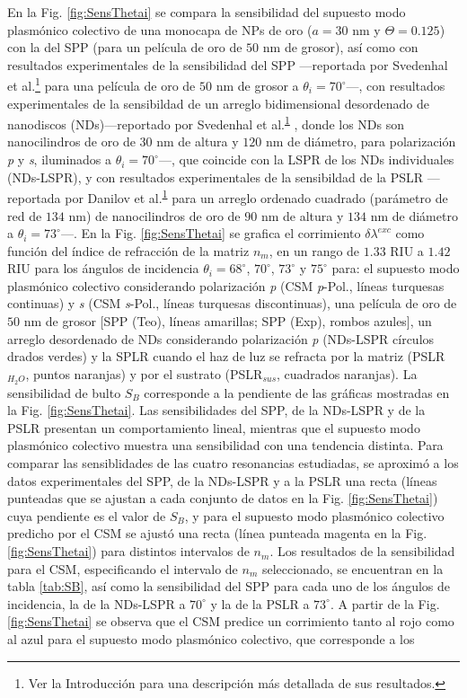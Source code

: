 En la Fig. \ref{fig:SensThetai} se compara la sensibilidad del supuesto modo  plasmónico colectivo de una monocapa de NPs de oro ($a=30$ nm y $\Theta=0.125$) con la del SPP (para un película de oro de $50$ nm de grosor), así como con resultados experimentales de la sensibilidad del SPP ---reportada por  Svedenhal et al.\footnote{\label{fn:Motivacion}Ver la Introducción para una descripción más detallada de sus resultados.} \cite{svedendahl2009refractometric} para una película de oro de $50$ nm de grosor a $\theta_i = 70^\circ$---, con resultados experimentales de la sensibildad de un  arreglo bidimensional desordenado de nanodiscos (NDs)---reportado por Svedenhal et al.\textsuperscript{\ref{fn:Motivacion}}  \cite{svedendahl2009refractometric}, donde los NDs son nanocilindros de oro de $30$ nm de altura y $120$ nm de diámetro, para polarización \emph{p} y \emph{s}, iluminados a $\theta_i = 70^\circ$---, que coincide con la LSPR de los NDs individuales (NDs-LSPR), y con resultados experimentales de la sensibildad de la PSLR ---reportada por Danilov et al.\textsuperscript{\ref{fn:Motivacion}} \cite{danilov2018ultra} para un arreglo ordenado cuadrado (parámetro de red de $134$ nm) de nanocilindros de oro de $90$ nm de altura y $134$ nm de diámetro a $\theta_i= 73^\circ$---. En la Fig. \ref{fig:SensThetai} se grafica el corrimiento $\delta\lambda^{exc}$ como función del índice de refracción de la matriz $n_m$, en un rango de $1.33$ RIU a $1.42$ RIU para los ángulos de incidencia $\theta_i = 68^\circ$, $70^\circ$, $73^\circ$ y $75^\circ$ para: el supuesto modo  plasmónico colectivo considerando polarización \emph{p} (CSM \textit{p}-Pol., líneas turquesas continuas) y \emph{s} (CSM \textit{s}-Pol., líneas turquesas discontinuas), una película de oro de $50$ nm de grosor [SPP (Teo), líneas amarillas; SPP (Exp), rombos azules], un arreglo desordenado de NDs  considerando polarización \emph{p} (NDs-LSPR círculos drados verdes) y la SPLR cuando el haz de luz se refracta por la matriz (PSLR$_{H_{2}O}$, puntos naranjas) y por el sustrato (PSLR$_{sus}$, cuadrados naranjas). La sensibilidad de bulto $S_B$ corresponde a la pendiente de las gráficas mostradas en la Fig. \ref{fig:SensThetai}. Las sensibilidades del SPP, de la NDs-LSPR y de la PSLR presentan un comportamiento lineal, mientras que el supuesto modo  plasmónico colectivo muestra una sensibilidad con una tendencia distinta. Para comparar las sensiblidades de las cuatro resonancias estudiadas, se aproximó a los datos experimentales del SPP, de la NDs-LSPR y a la PSLR una recta (líneas punteadas que se ajustan a cada conjunto de datos en la Fig. \ref{fig:SensThetai}) cuya pendiente es el valor de $S_B$, y para el supuesto modo  plasmónico colectivo predicho por el CSM se ajustó una recta (línea punteada magenta en la Fig. \ref{fig:SensThetai}) para distintos intervalos de $n_m$. Los resultados de la sensibilidad para el CSM, especificando el  intervalo de $n_m$ seleccionado, se  encuentran en la tabla \ref{tab:SB}, así como la sensibilidad del SPP para cada uno de los ángulos de incidencia, la de la NDs-LSPR a $70^\circ$ y la de la PSLR a $73^\circ$. A partir de la Fig. \ref{fig:SensThetai} se observa que el  CSM predice un corrimiento tanto al  rojo como al azul para el supuesto modo plasmónico colectivo, que corresponde a los 